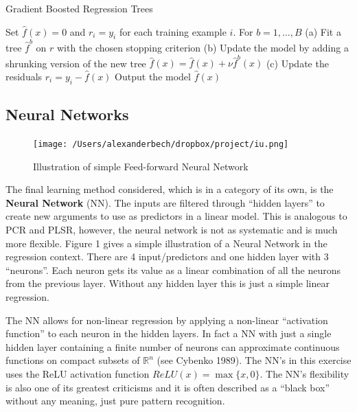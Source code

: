 \documentclass[11pt]{article}
\begin{document}
\begin{algorithm}
  \caption{Gradient  Boosted Regression Trees}
  \begin{algorithmic}[3]
  \State Set $\hat{f}(x) = 0$ and $r_i = y_i$ for each training example $i$.
  \State For $ b = 1, \dots, B$ \newline
  (a) Fit a tree $\hat{f}^b$ on $r$ with the chosen stopping criterion \newline
  (b) Update the model by adding a shrunking version of the new tree $\hat{f}(x) = \hat{f}(x) + \nu \hat{f}^b(x) $ \newline
  (c) Update the residuals $r_i = y_i - \hat{f}(x)$ \newline
  \State Output the model $\hat{f}(x)$  
  \end{algorithmic}
\end{algorithm}

\newpage

\hypertarget{neural-networks}{%
\subsection{Neural Networks}\label{neural-networks}}

\begin{figure}
    \texttt{[image: /Users/alexanderbech/dropbox/project/iu.png]}
  \caption{Illustration of simple Feed-forward Neural Network}
\end{figure}

The final learning method considered, which is in a category of its own,
is the \textbf{Neural Network} (NN). The inputs are filtered through
``hidden layers'' to create new arguments to use as predictors in a
linear model. This is analogous to PCR and PLSR, however, the neural
network is not as systematic and is much more flexible. Figure 1 gives a
simple illustration of a Neural Network in the regression context. There
are 4 input/predictors and one hidden layer with 3 ``neurons''. Each
neuron gets its value as a linear combination of all the neurons from the
previous layer. Without any hidden layer this is just a simple linear
regression.

The NN allows for non-linear regression by applying a non-linear
``activation function'' to each neuron in the hidden layers. In fact a
NN with just a single hidden layer containing a finite number of neurons
can approximate continuous functions on compact subsets of
\(\mathbb{R}^n\) (see Cybenko 1989). The NN's in this exercise uses the
ReLU activation function \(ReLU(x) = \max\{x,0\}\). The NN's flexibility
is also one of its greatest criticisms and it is often described as a
``black box'' without any meaning, just pure pattern recognition.
\end{document}
